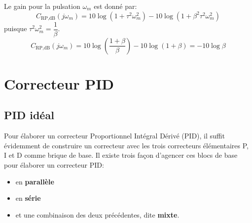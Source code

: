 Le gain pour la pulsation $\omega_m$ est donné par:
\[
    C_{\text{RP},\si{\dB}}(j\omega_m)=10\log{(1+\tau^2\omega_m^2)}-
                               10\log{(1+\beta^2\tau^2\omega_m^2)}
\]
puisque $\tau^2\omega_m^2=\dfrac{1}{\beta}$.
\[
    C_{\text{RP},\si{\dB}}(j\omega_m)
    =10\log{\left(\dfrac{1+\beta}{\beta}\right)}
    -10\log{\left(1+\beta\right)}=-10\log{\beta}
\]
\section{Correcteur PID}
\subsection{PID idéal}
Pour élaborer un correcteur Proportionnel Intégral Dérivé (PID), il suffit
évidemment de construire un correcteur avec les trois correcteurs 
élémentaires P, I et D comme brique de base. Il existe trois façon d'agencer
ces blocs de base pour élaborer un correcteur PID:
\begin{itemize}
    \item en \textbf{parallèle}
    \item en \textbf{série}
    \item et une combinaison des deux précédentes, dite \textbf{mixte}.
\end{itemize}

